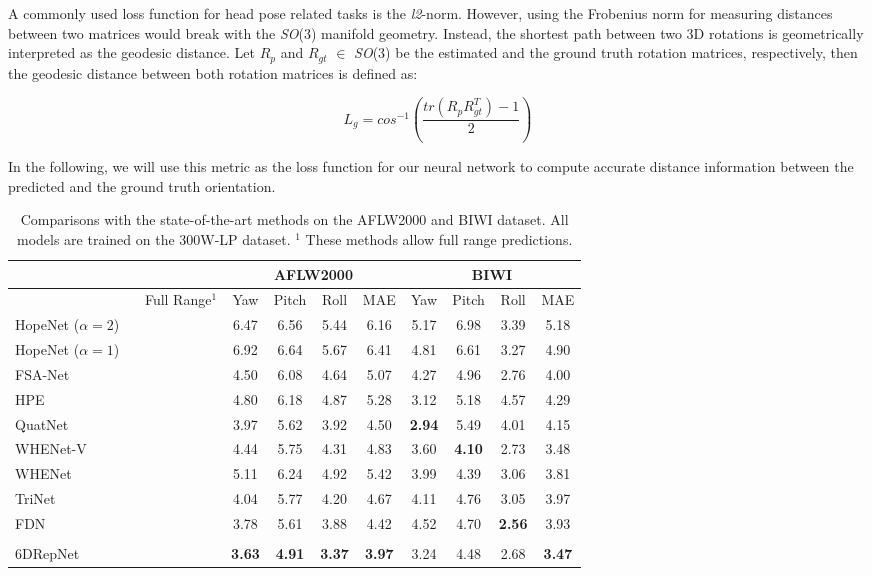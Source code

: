 \documentclass{article}
\newcommand{\cmark}{\ding{51}}\newcommand{\xmark}{\ding{55}}
\newcommand\netname{6DRepNet}
\begin{document}
A commonly used loss function for head pose related tasks is the \textit{l2}-norm. However, using the Frobenius norm for measuring distances between two matrices would break with the \textit{SO}(3) manifold geometry. Instead, the shortest path between two 3D rotations is geometrically interpreted as the geodesic distance. Let $R_p$ and $R_{gt}$ $\in$ \textit{SO}(3) be the estimated and the ground truth rotation matrices, respectively, then the geodesic distance between both rotation matrices is defined as:

\begin{equation}
    L_{g}=cos^{-1}\left( \frac{tr(R_p R_{gt}^T)-1}{2}\right)
\end{equation}

In the following, we will use this metric as the loss function for our neural network to compute accurate distance information between the predicted and the ground truth orientation.

\begin{table*}[t]
\centering
\begin{tabular} { l c@{\hskip .3in} c c c c @{\hskip .5in} c c c c }
\hline
& & \multicolumn{4}{c}{\textbf{AFLW2000}} {\hskip .5in} & \multicolumn{4}{c}{\textbf{BIWI}}\\
\hline
  & Full Range$^1$& Yaw & Pitch & Roll & MAE & Yaw & Pitch & Roll & MAE \\
  \hline
 HopeNet ($\alpha=2$) ~\cite{Ruiz2018FineGrainedHP}& \xmark  & 6.47 & 6.56 & 5.44 & 6.16  & 5.17& 6.98& 3.39 & 5.18\\ HopeNet ($\alpha=1$) ~\cite{Ruiz2018FineGrainedHP}& \xmark & 6.92 & 6.64 & 5.67 & 6.41 & 4.81& 6.61& 3.27 & 4.90\\ FSA-Net~\cite{Yang_2019_CVPR}& \xmark  & 4.50 & 6.08 & 4.64 & 5.07 & 4.27 & 4.96 & 2.76 & 4.00\\ 
 HPE~\cite{Huang2020ImprovingHP} & \xmark & 4.80 & 6.18 & 4.87 & 5.28 & 3.12 & 5.18 & 4.57 & 4.29 \\
 QuatNet~\cite{8444061}& \xmark  & 3.97 & 5.62  & 3.92 & 4.50 & \textbf{2.94} & 5.49 & 4.01 & 4.15  \\
 WHENet-V~\cite{Zhou2020WHENetRF}& \xmark &4.44& 5.75& 4.31& 4.83 & 3.60 & \textbf{4.10} & 2.73 & 3.48\\
 WHENet~\cite{Zhou2020WHENetRF} & \cmark \xmark & 5.11 & 6.24 & 4.92 & 5.42 & 3.99 & 4.39 & 3.06 & 3.81 \\
 TriNet~\cite{Cao_2021_WACV}& \cmark  & 4.04 & 5.77 & 4.20 & 4.67 & 4.11 & 4.76 & 3.05 & 3.97 \\
 FDN~\cite{Zhang2020FDNFD} & \xmark & 3.78 & 5.61 & 3.88 & 4.42 & 4.52 & 4.70 & \textbf{2.56} & 3.93\\
 \hline\\[-2ex] 
 \netname& \cmark &  \textbf{3.63} & \textbf{4.91} & \textbf{3.37} & \textbf{3.97} & 3.24 & 4.48 & 2.68 & \textbf{3.47}\\ 
 \hline
\end{tabular}
\caption{Comparisons with the state-of-the-art methods on the
AFLW2000 and BIWI dataset. All models are trained on the 300W-LP dataset. $^1$ These methods allow full range predictions.}
\label{table1}
\end{table*}
\end{document}
